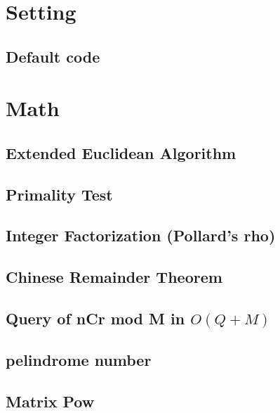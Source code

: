 \documentclass[9pt,landscape,a4paper,twocolumn]{extarticle}
\begin{document}
\tableofcontents


\section{Setting}

\subsection{Default code}


\section{Math}

\subsection{Extended Euclidean Algorithm}


\subsection{Primality Test}


\subsection{Integer Factorization (Pollard's rho)}


\subsection{Chinese Remainder Theorem}


\subsection{Query of nCr mod M in $O(Q+M)$}


\subsection{pelindrome number}


\subsection{Matrix Pow}

\end{document}
